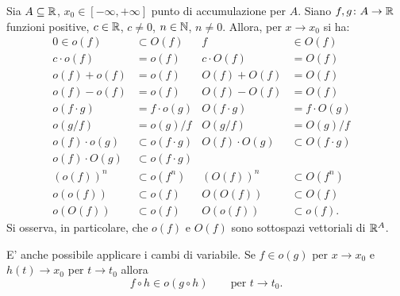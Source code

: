 \begin{theorem}
Sia $A\subseteq {\mathbb R}$, $x_0\in [-\infty, +\infty]$
punto di accumulazione per $A$.
Siano $f,g \colon A \to {\mathbb R}$ funzioni positive, $c\in {\mathbb R}$, $c\neq 0$, $n\in {\mathbb N}$, $n\neq 0$.
Allora, per $x\to x_0$ si ha:
\begin{align*}
0 \in o(f) &\subset O(f) & f&\in O(f)& \\
c \cdot o(f) &= o(f) & c \cdot O(f) &= O(f)\\
o(f)+o(f) &= o(f) & O(f)+O(f) &= O(f)\\
o(f)-o(f) &= o(f) & O(f)-O(f) &= O(f)\\
o(f\cdot g) &= f \cdot o(g) & O(f\cdot g) &= f\cdot O(g)\\
o(g/f) &= o(g) / f & O(g/f) &= O(g) / f\\
o(f)\cdot o(g) &\subset o(f\cdot g) & O(f)\cdot O(g) &\subset O(f\cdot g) \\
o(f)\cdot O(g) & \subset o(f\cdot g)&  & \\
(o(f))^n &\subset o(f^n) & (O(f))^n &\subset O(f^n)\\
o(o(f)) &\subset o(f) & O(O(f)) &\subset O(f)\\
o(O(f)) &\subset o(f) & O(o(f)) &\subset o(f)
.
\end{align*}
Si osserva, in particolare, che $o(f)$ e $O(f)$ sono sottospazi vettoriali di ${\mathbb R}^A$.

E' anche possibile applicare i cambi di variabile.
Se $f\in o(g)$ per $x\to x_0$ e $h(t) \to x_0$ per $t\to t_0$ allora
\[
  f \circ h \in o(g\circ h) \qquad \text{per $t\to t_0$}.
\]
\end{theorem}
%
